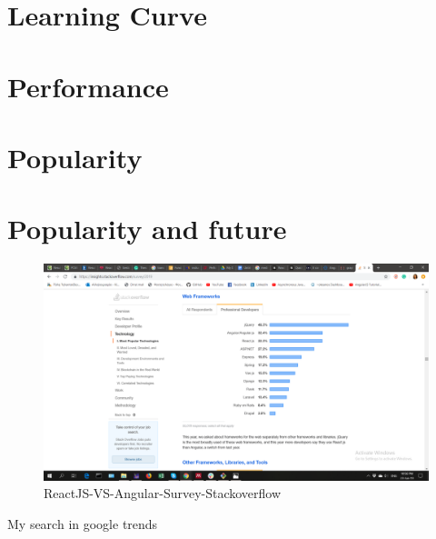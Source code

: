 \section{Learning Curve}


\section{Performance}


\section{Popularity}


\section{Popularity and future}


\begin{figure}[h!]
	\begin{center}
		\includegraphics[scale=0.35]{images/ReactJS-VS-Angular-Survey-Stackoverflow.png}
	\end{center}
	\caption{ReactJS-VS-Angular-Survey-Stackoverflow}
\end{figure}

My search in google trends

